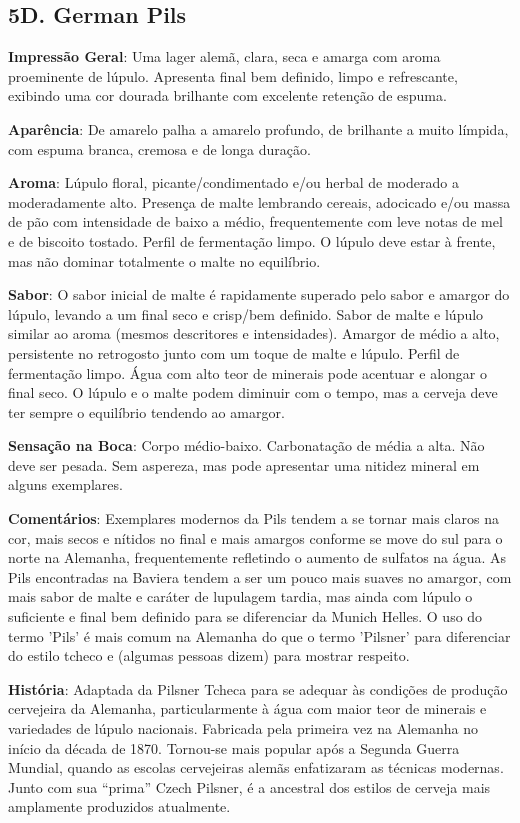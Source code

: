 \subsection*{5D. German Pils}

\textbf{Impressão Geral}: Uma lager alemã, clara, seca e amarga com aroma proeminente de lúpulo. Apresenta final bem definido, limpo e refrescante, exibindo uma cor dourada brilhante com excelente retenção de espuma.

\textbf{Aparência}: De amarelo palha a amarelo profundo, de brilhante a muito límpida, com espuma branca, cremosa e de longa duração.

\textbf{Aroma}: Lúpulo floral, picante/condimentado e/ou herbal de moderado a moderadamente alto. Presença de malte lembrando cereais, adocicado e/ou massa de pão com intensidade de baixo a médio, frequentemente com leve notas de mel e de biscoito tostado. Perfil de fermentação limpo. O lúpulo deve estar à frente, mas não dominar totalmente o malte no equilíbrio.

\textbf{Sabor}: O sabor inicial de malte é rapidamente superado pelo sabor e amargor do lúpulo, levando a um final seco e crisp/bem definido. Sabor de malte e lúpulo similar ao aroma (mesmos descritores e intensidades). Amargor de médio a alto, persistente no retrogosto junto com um toque de malte e lúpulo. Perfil de fermentação limpo. Água com alto teor de minerais pode acentuar e alongar o final seco. O lúpulo e o malte podem diminuir com o tempo, mas a cerveja deve ter sempre o equilíbrio tendendo ao amargor.

\textbf{Sensação na Boca}: Corpo médio-baixo. Carbonatação de média a alta. Não deve ser pesada. Sem aspereza, mas pode apresentar uma nitidez mineral em alguns exemplares.

\textbf{Comentários}: Exemplares modernos da Pils tendem a se tornar mais claros na cor, mais secos e nítidos no final e mais amargos conforme se move do sul para o norte na Alemanha, frequentemente refletindo o aumento de sulfatos na água. As Pils encontradas na Baviera tendem a ser um pouco mais suaves no amargor, com mais sabor de malte e caráter de lupulagem tardia, mas ainda com lúpulo o suficiente e final bem definido para se diferenciar da Munich Helles. O uso do termo 'Pils' é mais comum na Alemanha do que o termo 'Pilsner' para diferenciar do estilo tcheco e (algumas pessoas dizem) para mostrar respeito.

\textbf{História}: Adaptada da Pilsner Tcheca para se adequar às condições de produção cervejeira da Alemanha, particularmente à água com maior teor de minerais e variedades de lúpulo nacionais. Fabricada pela primeira vez na Alemanha no início da década de 1870. Tornou-se mais popular após a Segunda Guerra Mundial, quando as escolas cervejeiras alemãs enfatizaram as técnicas modernas. Junto com sua “prima” Czech Pilsner, é a ancestral dos estilos de cerveja mais amplamente produzidos atualmente.

